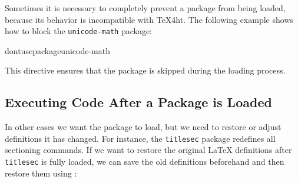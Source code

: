 Sometimes it is necessary to completely prevent a package from being loaded,
because its behavior is incompatible with \TeX4ht. The following example shows
how to block the \texttt{unicode-math} package:

\begin{texsource}
\:dontusepackage{unicode-math}
\DeclareDocumentCommand {}
\end{texsource}

This directive ensures that the package is skipped during the loading process.

\subsection{Executing Code After a Package is Loaded}

In other cases we want the package to load, but we need to restore or adjust
definitions it has changed. For instance, the \texttt{titlesec} package
redefines all sectioning commands. If we want to restore the original \LaTeX{}
definitions after \texttt{titlesec} is fully loaded, we can save the old
definitions beforehand and then restore them using
:

